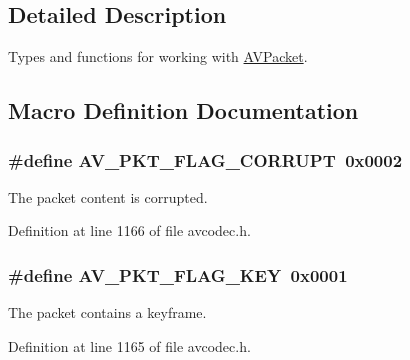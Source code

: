 \subsection{Detailed Description}
Types and functions for working with \hyperlink{struct_a_v_packet}{A\+V\+Packet}. 

\subsection{Macro Definition Documentation}
\subsubsection[{\texorpdfstring{A\+V\+\_\+\+P\+K\+T\+\_\+\+F\+L\+A\+G\+\_\+\+C\+O\+R\+R\+U\+PT}{AV_PKT_FLAG_CORRUPT}}]{\setlength{\rightskip}{0pt plus 5cm}\#define A\+V\+\_\+\+P\+K\+T\+\_\+\+F\+L\+A\+G\+\_\+\+C\+O\+R\+R\+U\+PT~0x0002}\hypertarget{group__lavc__packet_ga46187df0d7711108ece88804dcc38025}{}\label{group__lavc__packet_ga46187df0d7711108ece88804dcc38025}


The packet content is corrupted. 



Definition at line 1166 of file avcodec.\+h.

\subsubsection[{\texorpdfstring{A\+V\+\_\+\+P\+K\+T\+\_\+\+F\+L\+A\+G\+\_\+\+K\+EY}{AV_PKT_FLAG_KEY}}]{\setlength{\rightskip}{0pt plus 5cm}\#define A\+V\+\_\+\+P\+K\+T\+\_\+\+F\+L\+A\+G\+\_\+\+K\+EY~0x0001}\hypertarget{group__lavc__packet_ga75603d7c2b8adf5829f4fd2fb860168f}{}\label{group__lavc__packet_ga75603d7c2b8adf5829f4fd2fb860168f}


The packet contains a keyframe. 



Definition at line 1165 of file avcodec.\+h.



